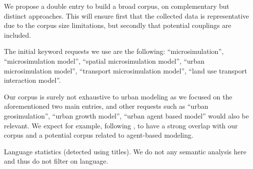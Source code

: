 We propose a double entry to build a broad corpus, on complementary but distinct approaches. This will ensure first that the collected data is representative due to the corpus size limitations, but secondly that potential couplings are included. %

The initial keyword requests we use are the following: ``microsimulation'', ``microsimulation model'', ``spatial microsimulation model'', ``urban microsimulation model'', ``transport microsimulation model'', ``land use transport interaction model''.


Our corpus is surely not exhaustive to urban modeling as we focused on the aforementioned two main entries, and other requests such as ``urban geosimulation'', ``urban growth model'', ``urban agent based model'' would also be relevant. We expect for example, following \cite{wise2016transportation}, to have a strong overlap with our corpus and a potential corpus related to agent-based modeling.



Language statistics (detected using titles). We do not any semantic analysis here and thus do not filter on language.





